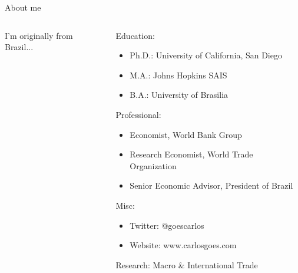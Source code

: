 \documentclass[notes,11pt, aspectratio=169, xcolor=table]{beamer}
\newenvironment{wideitemize}{\itemize\addtolength{\itemsep}{10pt}}{\enditemize}
\begin{document}
\begin{frame}{About me}

\begin{columns}[T] %
\begin{column}{.38\textwidth}
I'm originally from Brazil...
\vspace{10cm}
\end{column}%
\hfill%
\begin{column}{.58\textwidth}
  \begin{wideitemize}
    \item Education:
    \begin{itemize}
        \item Ph.D.: University of California, San Diego 
        \item M.A.: Johns Hopkins SAIS 
        \item B.A.: University of Brasilia 
    \end{itemize}
    \item Professional:
    \begin{itemize}
        \item Economist, World Bank Group 
        \item Research Economist, World Trade Organization
        \item Senior Economic Advisor, President of Brazil
    \end{itemize}    
    \item Misc:
    \begin{itemize}
        \item Twitter: @goescarlos
        \item Website: www.carlosgoes.com
    \end{itemize}    
    \item Research: Macro \& International Trade
  \end{wideitemize}
\end{column}%
\end{columns}
\end{frame}
\end{document}
